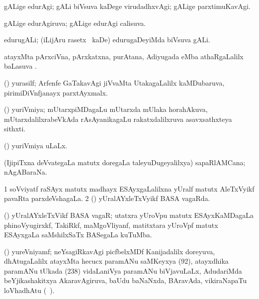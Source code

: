 \bentry
{} 
\gl{\kirxvi}
\expl{}
\bmng
gALige edurAgi; gALi biVsuva kaDege virudadhxvAgi; gALige parxtimuKavAgi. 
\emng
\eentry

\bentry
{} 
\gl{\gu}
\expl{}
\bmng
gALige edurAgiruva; gALige edurAgi calisuva. 
\emng
\eentry

\bentry
{} 
\gl{\nA}
\expl{}
\bmng
edurugALi; (iLijAru rasetx \mo\ kaDe) edurugaDeyiMda biVsuva gALi. 
\emng
\eentry

\bentry
{} 
\gl{\sapUpa}
\expl{}
\bmng
atayxMta pArxciVna, pArxkatxna, purAtana, Adiyugada eMba athaRgaLalilx baLasuva \sapUpa. 
\emng
\eentry

\bentry
{} 
\gl{\nA}
\expl{}
\bmng
(\jiVra) yurasilf; Arfenfe GaTakavAgi jiVvaMta UtakagaLalilx kaMDubaruva, pirimiDiVnfjanayx parxtAyxmalx. 
\emng
\eentry

\bentry
{} 
\gl{\nA}
\expl{}
\bmng
(\roVshA) yuriVmiya; mUtarxpiMDagaLu mUtarxda mUlaka horahAkuva, mUtarxdalilxrabeVkAda rAsAyanikagaLu rakatxdalilxruva asavxsathxteya sithxti. 
\emng
\eentry

\bentry
{} 
\gl{\gu}
\bmng
(\roVshA) yuriVmiya uLaLx. 
\emng
\eentry

{} 
\gl{\nA}
\expl{}
\bmng
(IjipiTxna deVvategaLa matutx doregaLa taleyuDugeyalilxya) sapaRlAMCana; nAgABaraNa.  
\emng
\eentry

\bentry
{} 
\gl{\gu}
\expl{}
\bmng
\bnum
\num{1} soVviyatf raSAyx matutx madhayx ESAyxgaLalilxna yUralf matutx AleTxVyikf pavaRta parxdeVshagaLa. 
\num{2} (\BAshA) yUralAYxleTxVyikf BASA vagaRda. 
\enum
\emng
\eentry

\bentry
{} 
\gl{\nA}
\expl{}
\bmng
(\BAshA) yUralAYxleTxVikf BASA vagaR; utatxra yUroVpu matutx ESAyxKaMDagaLa phinoVyugirxkf, TakiRkf, maMgoVliyanf, matitxtara yUroVpf matutx ESAyxgaLa saMshilxSaTx BASegaLa kuTuMba. 
\emng
\eentry

\bentry
{} 
\gl{\nA}
\expl{}
\bmng
(\ravi) yureVniyamf; neYsagiRkavAgi picfbelxMDf Kanijadalilx doreyuva, dhAtugaLalilx atayxMta hecucx paramANu saMKeyxya (92), atayxdhika paramANu tUkada (238) vidaLaniVya paramANu biVjavuLaLx, AdudariMda beYjikashakitxya AkaravAgiruva, baUdu baNaNxda, BAravAda, vikiraNapaTu loVhadhAtu (\saMkeV\ ). 
\emng
\eentry

